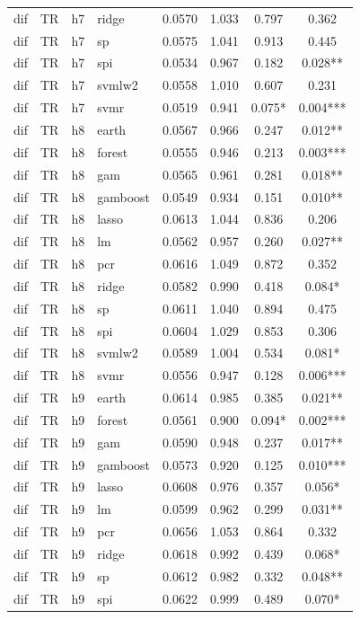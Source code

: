 \begin{ThreePartTable}
\begin{longtable}[t]{llclcccc}
dif & TR & h7 & ridge & 0.0570 & 1.033 & 0.797 & 0.362\\
dif & TR & h7 & sp & 0.0575 & 1.041 & 0.913 & 0.445\\
dif & TR & h7 & spi & 0.0534 & 0.967 & 0.182 & 0.028**\\
dif & TR & h7 & svmlw2 & 0.0558 & 1.010 & 0.607 & 0.231\\
dif & TR & h7 & svmr & 0.0519 & 0.941 & 0.075* & 0.004***\\
\addlinespace
dif & TR & h8 & earth & 0.0567 & 0.966 & 0.247 & 0.012**\\
dif & TR & h8 & forest & 0.0555 & 0.946 & 0.213 & 0.003***\\
dif & TR & h8 & gam & 0.0565 & 0.961 & 0.281 & 0.018**\\
dif & TR & h8 & gamboost & 0.0549 & 0.934 & 0.151 & 0.010**\\
dif & TR & h8 & lasso & 0.0613 & 1.044 & 0.836 & 0.206\\
dif & TR & h8 & lm & 0.0562 & 0.957 & 0.260 & 0.027**\\
dif & TR & h8 & pcr & 0.0616 & 1.049 & 0.872 & 0.352\\
dif & TR & h8 & ridge & 0.0582 & 0.990 & 0.418 & 0.084*\\
dif & TR & h8 & sp & 0.0611 & 1.040 & 0.894 & 0.475\\
dif & TR & h8 & spi & 0.0604 & 1.029 & 0.853 & 0.306\\
dif & TR & h8 & svmlw2 & 0.0589 & 1.004 & 0.534 & 0.081*\\
dif & TR & h8 & svmr & 0.0556 & 0.947 & 0.128 & 0.006***\\
\addlinespace
dif & TR & h9 & earth & 0.0614 & 0.985 & 0.385 & 0.021**\\
dif & TR & h9 & forest & 0.0561 & 0.900 & 0.094* & 0.002***\\
dif & TR & h9 & gam & 0.0590 & 0.948 & 0.237 & 0.017**\\
dif & TR & h9 & gamboost & 0.0573 & 0.920 & 0.125 & 0.010***\\
dif & TR & h9 & lasso & 0.0608 & 0.976 & 0.357 & 0.056*\\
dif & TR & h9 & lm & 0.0599 & 0.962 & 0.299 & 0.031**\\
dif & TR & h9 & pcr & 0.0656 & 1.053 & 0.864 & 0.332\\
dif & TR & h9 & ridge & 0.0618 & 0.992 & 0.439 & 0.068*\\
dif & TR & h9 & sp & 0.0612 & 0.982 & 0.332 & 0.048**\\
dif & TR & h9 & spi & 0.0622 & 0.999 & 0.489 & 0.070*\\

\end{longtable}
\end{ThreePartTable}
